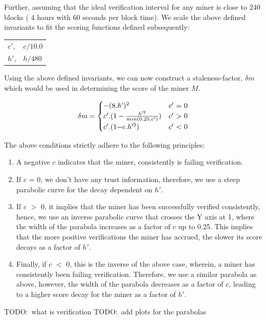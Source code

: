 \documentclass[UTF8, 10pt, nonatbib, nocopyrightspace, reprint]{sigplanconf}
\newcommand{\todo}[1]{}
\renewcommand{\todo}[1]{{\color{red} TODO:\ {#1}}}
\begin{document}
Further, assuming that the ideal verification interval for any miner is close to 240 blocks ( 4 hours with 60 seconds per block time). We scale the above defined invariants to fit the scoring functions defined subsequently:

\begin{tabular}{l l}
        $c'$, &$c/10.0$\\
        $h'$, &$h/480$ \\
\end{tabular}

Using the above defined invariants, we can now construct a staleness-factor, $\delta{m}$ which would be used in determining the score of the miner $M$.

\begin{equation*} \label{score}
        \delta{m} = \begin{cases}
        	-(8.h')^{2}&\text{$c'$ = 0}\\
        	c'.(1 - \frac{h'^{2}}{min(0.25, c')})&\text{$c'$ $>$ 0}\\
        	c'.(1 - $c$.h'^{2})&\text{$c'$ $<$ 0}
        \end{cases}
\end{equation*}

The above conditions strictly adhere to the following principles:

\begin{enumerate}
  \item A negative $c$ indicates that the miner, consistently is failing verification.
  \item If $c$ = 0, we don't have any trust information, therefore, we use a steep parabolic curve for the decay dependent on $h'$.
  \item If $c$ $>$ 0, it implies that the miner has been successfully verified consistently, hence, we use an inverse parabolic curve that crosses the Y axis at 1, where the width of the parabola increases as a factor of $c$ up to 0.25. This implies that the more positive verifications the miner has accrued, the slower its score decays as a factor of $h'$.
  \item Finally, if $c$ $<$ 0, this is the inverse of the above case, wherein, a miner has consistently been failing verification. Therefore, we use a similar parabola as above, however, the width of the parabola decreases as a factor of $c$, leading to a higher score decay for the miner as a factor of $h'$.
\end{enumerate}

\todo{what is verification}\newline
\todo{add plots for the parabolas}
\end{document}
